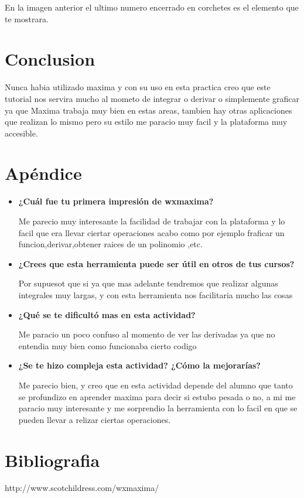 \documentclass{article}
\begin{document}
En la imagen anterior el ultimo numero encerrado en corchetes es el elemento que te mostrara.


\section{Conclusion}


Nunca habia utilizado maxima y con su uso en esta practica creo que este tutorial nos servira mucho al mometo de integrar o derivar o simplemente graficar ya que Maxima trabaja muy bien en estas areas, tambien hay otras aplicaciones que realizan lo mismo pero su estilo me paracio muy facil y la plataforma muy accesible.


\section{Apéndice}
\begin{itemize}
\item \textbf{¿Cuál fue tu primera impresión de wxmaxima?}

Me parecio muy interesante la facilidad de trabajar con la plataforma y lo facil que era llevar ciertar operaciones acabo como por ejemplo fraficar un funcion,derivar,obtener raices de un polinomio ,etc.

\vspace{0.1cm}


\item \textbf{¿Crees que esta herramienta puede ser útil en otros de tus cursos?}

Por supuesot que si ya que mas adelante tendremos que realizar algunas integrales muy largas, y con esta herramienta nos facilitaria mucho las cosas 

\vspace{0.1cm}


\item \textbf{ ¿Qué se te dificultó mas en esta actividad?}

Me paracio un poco confuso al momento de ver las derivadas ya que no entendia muy bien como funcionaba cierto codigo


\vspace{0.1cm}

\item \textbf{ ¿Se te hizo compleja esta actividad? ¿Cómo la mejorarías? }


Me parecio bien, y creo que en esta actividad depende del alumno que tanto se profundizo en aprender maxima para decir si estubo pesada o no, a mi me paracio muy interesante y me sorprendio la herramienta con lo facil en que se pueden llevar a relizar ciertas operaciones.


\end{itemize}
 

\section{Bibliografia}

http://www.scotchildress.com/wxmaxima/
\end{document}
